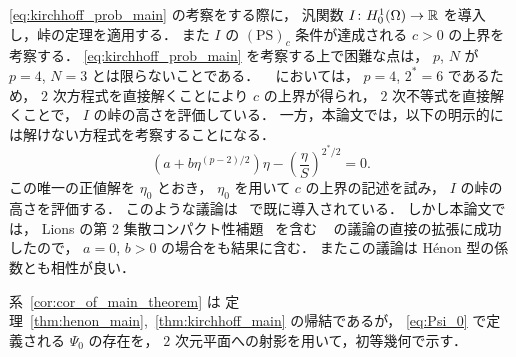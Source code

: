 \eqref{eq:kirchhoff_prob_main} の考察をする際に，
汎関数 $I \colon H_0^1(\Omega) \to \mathbb{R}$ を導入し，峠の定理を適用する．
また $I$ の $(\text{PS})_c$ 条件が達成される $c > 0$ の上界を考察する．
\eqref{eq:kirchhoff_prob_main} を考察する上で困難な点は，
$p$, $N$ が $p = 4$, $N = 3$ とは限らないことである．
~\cite{MR3278854} においては， $p = 4$, $2^* = 6$
であるため， $2$ 次方程式を直接解くことにより
$c$ の上界が得られ，
$2$ 次不等式を直接解くことで， $I$ の峠の高さを評価している．
一方，本論文では，以下の明示的には解けない方程式を考察することになる．
\[
  \left( a + b \eta^{(p-2)/2} \right) \eta - \left( \frac{\eta}{S} \right)^{2^*/2} = 0.
\]
この唯一の正値解を $\eta_0$ とおき，
$\eta_0$ を用いて $c$ の上界の記述を試み，
$I$ の峠の高さを評価する．
このような議論は~\cite{MR3539075} で既に導入されている．
しかし本論文では，
Lions の第 2 集散コンパクト性補題~\cite{MR834360} を含む
~\cite{MR3278854} の議論の直接の拡張に成功したので，
$a = 0$, $b > 0$ の場合をも結果に含む．
またこの議論は Hénon 型の係数とも相性が良い．

系~\ref{cor:cor_of_main_theorem} は
定理~\ref{thm:henon_main},~\ref{thm:kirchhoff_main}
の帰結であるが，
\eqref{eq:Psi_0} で定義される $\Psi_0$ の存在を，
$2$ 次元平面への射影を用いて，初等幾何で示す．
